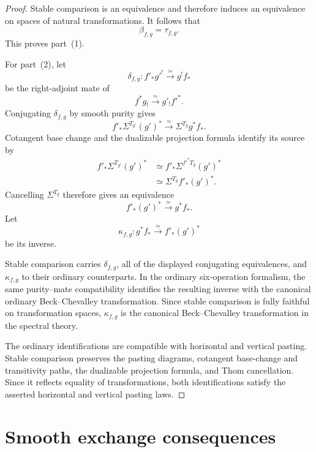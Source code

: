 \begin{proof}
Stable comparison is an equivalence and therefore induces an equivalence on
spaces of natural transformations.  It follows that
\[
    \beta_{f,g}
    =
    \tau_{f,g}.
\]
This proves part~(1).

For part~(2), let
\[
    \delta_{f,g}:
    f'_*g'^!
    \xrightarrow{\simeq}
    g^!f_*
\]
be the right-adjoint mate of
\[
    f^*g_!
    \xrightarrow{\simeq}
    g'_!f'^*.
\]
Conjugating \(\delta_{f,g}\) by smooth purity gives
\[
    f'_*\Sigma^{T_{g'}}(g')^*
    \xrightarrow{\simeq}
    \Sigma^{T_g}g^*f_*.
\]
Cotangent base change and the dualizable projection formula identify its
source by
\[
\begin{aligned}
    f'_*\Sigma^{T_{g'}}(g')^*
    &\simeq
    f'_*\Sigma^{f'^*T_g}(g')^* \\
    &\simeq
    \Sigma^{T_g}f'_*(g')^*.
\end{aligned}
\]
Cancelling \(\Sigma^{T_g}\) therefore gives an equivalence
\[
    f'_*(g')^*
    \xrightarrow{\simeq}
    g^*f_*.
\]
Let
\[
    \kappa_{f,g}:
    g^*f_*
    \xrightarrow{\simeq}
    f'_*(g')^*
\]
be its inverse.

Stable comparison carries \(\delta_{f,g}\), all of the displayed
conjugating equivalences, and \(\kappa_{f,g}\) to their ordinary
counterparts.  In the ordinary six-operation formalism, the same
purity--mate compatibility identifies the resulting inverse with the
canonical ordinary Beck--Chevalley transformation.  Since stable comparison
is fully faithful on transformation spaces,
\(\kappa_{f,g}\) is the canonical Beck--Chevalley transformation in the
spectral theory.

The ordinary identifications are compatible with horizontal and vertical
pasting.  Stable comparison preserves the pasting diagrams, cotangent
base-change and transitivity paths, the dualizable projection formula, and
Thom cancellation.  Since it reflects equality of transformations, both
identifications satisfy the asserted horizontal and vertical pasting laws.
\end{proof}


\section{Smooth exchange consequences}
\label{sec:smooth-exchange-consequences}

